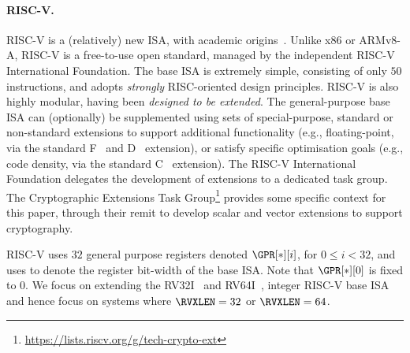 
\paragraph{RISC-V.}
\label{sec:bg:riscv}

RISC-V is a (relatively) new ISA, with academic origins~\cite{riscv:1,riscv:2}.
Unlike x86 or ARMv8-A, RISC-V is a free-to-use 
open standard, managed by the independent RISC-V International Foundation.
The base ISA is extremely simple, consisting of only $50$ instructions,
and adopts {\em strongly} RISC-oriented design principles.
RISC-V is also highly modular, having been {\em designed to be extended}.
The general-purpose base ISA can (optionally) be
supplemented using sets of special-purpose, standard or non-standard
extensions to
support additional functionality 
(e.g., floating-point, 
       via the 
       standard F~\cite[Section 11]{RV:ISA:I:19}
                and
                D~\cite[Section 12]{RV:ISA:I:19}
       extension),
or 
satisfy specific optimisation goals
(e.g., code density, 
       via the 
       standard C~\cite[Section 16]{RV:ISA:I:19}
       extension).
The RISC-V International Foundation delegates the development of
extensions to a dedicated task group.
The Cryptographic Extensions Task
Group\footnote{
  \url{https://lists.riscv.org/g/tech-crypto-ext}
} provides some specific context for this paper, through their remit to 
develop scalar and vector extensions to support cryptography.

RISC-V uses $32$ general purpose registers
denoted $\GPR[*][ i ]$, for $0 \leq i < 32$,
and uses \RVXLEN to denote the register bit-width of the base ISA.
Note that 
$
\GPR[*][ 0 ]
$
is fixed to $0$.
We focus on extending the
RV32I~\cite[Section 2]{RV:ISA:I:19}
and 
RV64I~\cite[Section 5]{RV:ISA:I:19},
integer RISC-V base ISA
and hence focus on systems where 
$\RVXLEN = 32$
or
$\RVXLEN = 64$.

